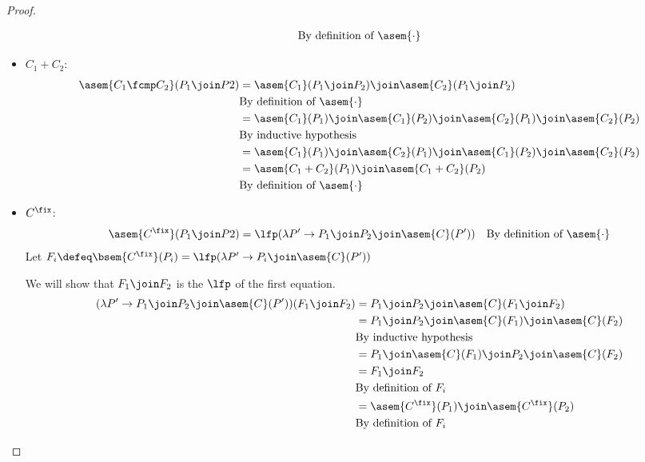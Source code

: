 \begin{proof}
\begin{itemize}
\begin{align*}
          &\text{By definition of $\asem{\cdot}$} \\
      \end{align*}
    \item $C_1 + C_2$:
      \begin{align*}
        \asem{C_1 \fcmp C_2}(P_1 \join P2)
          &= \asem{C_1}(P_1 \join P_2) \join \asem{C_2}(P_1 \join P_2) \\
          &\text{By definition of $\asem{\cdot}$} \\
          &= \asem{C_1}(P_1) \join \asem{C_1}(P_2) \join \asem{C_2}(P_1)
            \join \asem{C_2}(P_2) \\
          &\text{By inductive hypothesis} \\
          &= \asem{C_1}(P_1) \join \asem{C_2}(P_1) \join \asem{C_1}(P_2)
            \join \asem{C_2}(P_2) \\
          &= \asem{C_1 + C_2}(P_1) \join \asem{C_1 + C_2}(P_2) \\
          &\text{By definition of $\asem{\cdot}$} \\
      \end{align*}
    \item $C^\fix$:
      \begin{align*}
        \asem{C^\fix}(P_1 \join P2)
          &= \lfp(\lambda P' \to P_1 \join P_2 \join \asem{C}(P'))
          &\text{By definition of $\asem{\cdot}$}
      \end{align*}
      Let $F_i \defeq \bsem{C^\fix}(P_i) = \lfp(\lambda P' \to P_i \join 
      \asem{C}(P'))$

      We will show that $F_1 \join F_2$ is the $\lfp$ of the first equation.
      \begin{align*}
        (\lambda P' \to P_1 \join P_2 \join \asem{C}(P'))(F_1 \join F_2)
          &= P_1 \join P_2 \join \asem{C}(F_1 \join F_2) \\
          &= P_1 \join P_2 \join \asem{C}(F_1) \join \asem{C}(F_2)  \\
          &\text{By inductive hypothesis}\\
          &= P_1 \join \asem{C}(F_1) \join P_2 \join \asem{C}(F_2) \\
          &= F_1 \join F_2 \\
          &\text{By definition of $F_i$}\\
          &= \asem{C^\fix}(P_1) \join \asem{C^\fix}(P_2) \\
          &\text{By definition of $F_i$}\\
      \end{align*}


\end{itemize}
\end{proof}
